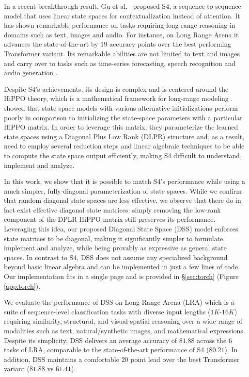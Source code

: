 In a recent breakthrough result, Gu et al.\ \cite{gu2022efficiently} proposed S4, a sequence-to-sequence model that uses linear state spaces for contextualization instead of attention. It has shown remarkable performance on tasks requiring long-range reasoning in domains such as text, images and audio. For instance, on Long Range Arena it advances the state-of-the-art by $19$ accuracy points over the best performing Transformer variant. Its remarkable abilities are not limited to text and images and carry over to tasks such as time-series forecasting, speech recognition and audio generation \cite{goel2022sashimi}.

Despite S4's achievements, its design is complex and is centered around the HiPPO theory, which is a mathematical framework for long-range modeling \cite{Voelker2019LegendreMU,gu2020hippo,gu2021combining}. \cite{gu2022efficiently} showed that state space models with various alternative initializations perform poorly in comparison to initializing the state-space parameters with a particular HiPPO matrix. In order to leverage this matrix, they parameterize the learned state spaces using a Diagonal Plus Low Rank (DLPR) structure and, as a result, need to employ several reduction steps and linear algebraic techniques to be able to compute the state space output efficiently, making S4 difficult to understand, implement and analyze.

In this work, we show that it is possible to match S4's performance while using a much simpler, fully-diagonal parameterization of state spaces. While we confirm that random diagonal state spaces are less effective, we observe that there do in fact exist effective diagonal state matrices: simply removing the low-rank component of the DPLR HiPPO matrix still preserves its performance. Leveraging this idea, our proposed Diagonal State Space (DSS) model enforces state matrices to be diagonal, making it significantly simpler to formulate, implement and analyze, while being provably as expressive as general state spaces. In contrast to S4, DSS does not assume any specialized background beyond basic linear algebra and can be implemented in just a few lines of code. Our implementation fits in a single page and is provided in \S\ref{sec:torch} (Figure \ref{app:torch}).

We evaluate the performance of DSS on Long Range Arena (LRA) which is a suite of sequence-level classification tasks with diverse input lengths ($1K$-$16K$) requiring similarity, structural, and visual-spatial reasoning over a wide range of modalities such as text, natural/synthetic images, and mathematical expressions. Despite its simplicity, DSS delivers an average accuracy of $81.88$ across the $6$ tasks of LRA, comparable to the state-of-the-art performance of S4 ($80.21$). In addition, DSS maintains a comfortable $20$ point lead over the best Transformer variant ($81.88$ vs $61.41$).

